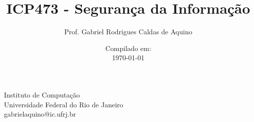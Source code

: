 \title{ICP473 - Segurança da Informação}

\author{Prof. Gabriel Rodrigues Caldas de Aquino}

\institute
{
  Instituto de Computação \\
  Universidade Federal do Rio de Janeiro\\
  gabrielaquino@ic.ufrj.br%
}
\date{Compilado em: \\ \today} %




\begin{frame}
  \titlepage
\end{frame}




